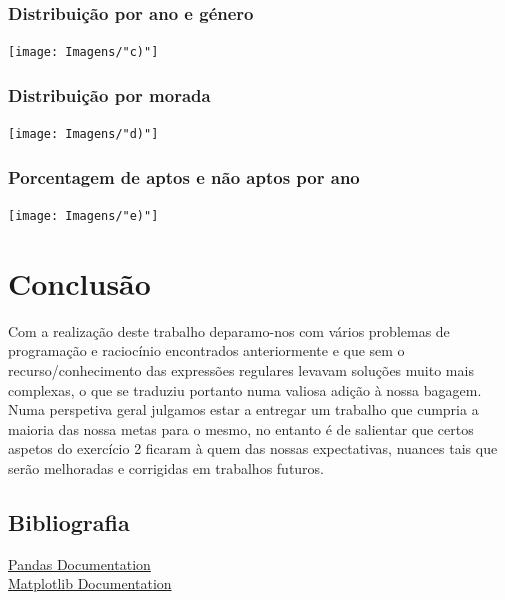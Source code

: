 \documentclass[11pt,a4paper]{report}%
\begin{document}
\subsection{Distribuição por ano e género}

\texttt{[image: Imagens/"c)"]}

\subsection{Distribuição por morada}

\texttt{[image: Imagens/"d)"]}

\subsection{Porcentagem de aptos e não aptos por ano}

\texttt{[image: Imagens/"e)"]}



\chapter{Conclusão} \label{concl}
Com a realização deste trabalho deparamo-nos com vários problemas de programação e raciocínio encontrados anteriormente e que sem o recurso/conhecimento das expressões regulares levavam soluções muito mais complexas, o que se traduziu portanto numa valiosa adição à nossa bagagem.
Numa perspetiva geral julgamos estar a entregar um trabalho que cumpria a maioria das nossa metas para o mesmo, no entanto é de salientar que certos aspetos do exercício 2 ficaram à quem das nossas expectativas, nuances tais que serão melhoradas e corrigidas em trabalhos futuros.

\newpage

\section{Bibliografia}
\href{https://pandas.pydata.org/docs/}{Pandas Documentation}
\\
\href{https://matplotlib.org/stable/index.html}{Matplotlib Documentation}


\appendix %
\end{document}
